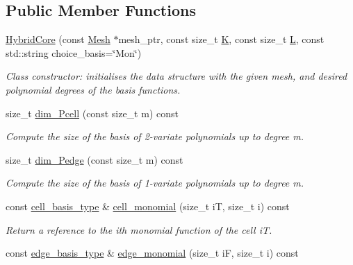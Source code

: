 \subsection*{Public Member Functions}
\begin{DoxyCompactItemize}
\item 
\hyperlink{classHArDCore2D_1_1HybridCore_af4978b5ad1f20f152357e94ffa94bfa9}{Hybrid\+Core} (const \hyperlink{classHArDCore2D_1_1Mesh}{Mesh} $\ast$mesh\+\_\+ptr, const size\+\_\+t \hyperlink{group__HybridCore_gadaf859b98dea34338c9e6376e975b131}{K}, const size\+\_\+t \hyperlink{group__HybridCore_ga816cd87658b200d1ea32d2c4fefd5c6e}{L}, const std\+::string choice\+\_\+basis=\char`\"{}Mon\char`\"{})
\begin{DoxyCompactList}\small\item\em Class constructor\+: initialises the data structure with the given mesh, and desired polynomial degrees of the basis functions. \end{DoxyCompactList}\item 
size\+\_\+t \hyperlink{classHArDCore2D_1_1HybridCore_aa2bdc59d150566e1b992058031509d2f}{dim\+\_\+\+Pcell} (const size\+\_\+t m) const
\begin{DoxyCompactList}\small\item\em Compute the size of the basis of 2-\/variate polynomials up to degree m. \end{DoxyCompactList}\item 
size\+\_\+t \hyperlink{classHArDCore2D_1_1HybridCore_ab0fb57313f27fb8b4a6e9747de1d5cfe}{dim\+\_\+\+Pedge} (const size\+\_\+t m) const
\begin{DoxyCompactList}\small\item\em Compute the size of the basis of 1-\/variate polynomials up to degree m. \end{DoxyCompactList}\item 
const \hyperlink{classHArDCore2D_1_1HybridCore_a4b9c53f6ec13dc9e73f5cdc5c8ae782b}{cell\+\_\+basis\+\_\+type} \& \hyperlink{classHArDCore2D_1_1HybridCore_aa7006921a9e212784abf688f63a855a0}{cell\+\_\+monomial} (size\+\_\+t iT, size\+\_\+t i) const
\begin{DoxyCompactList}\small\item\em Return a reference to the i\textquotesingle{}th monomial function of the cell iT. \end{DoxyCompactList}\item 
const \hyperlink{classHArDCore2D_1_1HybridCore_a9e3231c1356e797daaa3476ff1fa4154}{edge\+\_\+basis\+\_\+type} \& \hyperlink{classHArDCore2D_1_1HybridCore_a9a0879fca63fe056f75bb0574584639b}{edge\+\_\+monomial} (size\+\_\+t iF, size\+\_\+t i) const

\end{DoxyCompactItemize}
